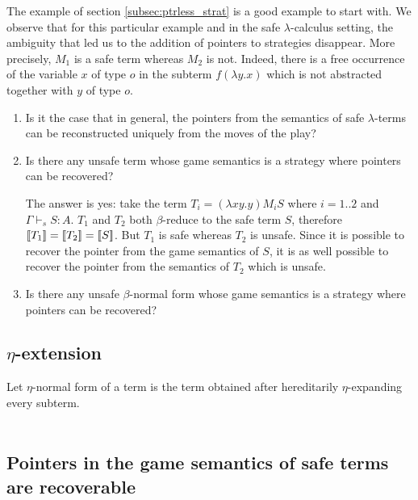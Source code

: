 The example of section \ref{subsec:ptrless_strat} is a good example
to start with. We observe that for this particular example and in
the safe $\lambda$-calculus setting, the ambiguity that led us to
the addition of pointers to strategies disappear. More precisely,
$M_1$ is a safe term whereas $M_2$ is not. Indeed, there is a free
occurrence of the variable $x$ of type $o$ in the subterm $f
(\lambda y . x)$ which is not abstracted together with $y$ of type
$o$.


\begin{enumerate}
\item
Is it the case that in general, the pointers from the semantics of
safe $\lambda$-terms can be reconstructed uniquely from the moves of
the play?


\item
Is there any unsafe term whose game semantics is a strategy where
pointers can be recovered?

The answer is yes: take the term $T_i = (\lambda x y . y) M_i S$
where $i =1..2$ and $\Gamma \vdash_s S : A$. $T_1$ and $T_2$ both
$\beta$-reduce to the safe term $S$, therefore
${[\![ T_1 ]\!]}={[\![ T_2 ]\!]}={[\![ S ]\!]}$. But $T_1$ is safe whereas $T_2$ is
unsafe. Since it is possible to recover the pointer from the game
semantics of $S$, it is as well possible to recover the pointer from
the semantics of $T_2$ which is unsafe.

\item
Is there any unsafe $\beta$-normal form whose game semantics is a
strategy where pointers can be recovered?


\end{enumerate}


\subsection{$\eta$-extension}

Let $\eta$-normal form of a term is the term obtained after
hereditarily $\eta$-expanding every subterm.

\def\etanfaux#1{\lceil#1 \rceil}
\def\etanf#1{\eta-nf\left( #1 \right)}

\begin{eqnarray*}
\end{eqnarray*}

\subsection{Pointers in the game semantics of safe terms are recoverable}

